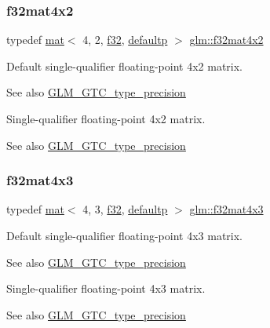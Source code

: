 \subsubsection{\texorpdfstring{f32mat4x2}{f32mat4x2}}
{\footnotesize\ttfamily typedef \hyperlink{structglm_1_1mat}{mat}$<$ 4, 2, \hyperlink{group__gtc__type__precision_ga0ec999b57f5330d9021256e96038df04}{f32}, \hyperlink{namespaceglm_a36ed105b07c7746804d7fdc7cc90ff25a9d21ccd8b5a009ec7eb7677befc3bf51}{defaultp} $>$ \hyperlink{group__gtc__type__precision_gab0498cc84bb77002f41630e3cd0be87b}{glm\+::f32mat4x2}}

Default single-\/qualifier floating-\/point 4x2 matrix. \begin{DoxySeeAlso}{See also}
\hyperlink{group__gtc__type__precision}{G\+L\+M\+\_\+\+G\+T\+C\+\_\+type\+\_\+precision}
\end{DoxySeeAlso}
Single-\/qualifier floating-\/point 4x2 matrix. \begin{DoxySeeAlso}{See also}
\hyperlink{group__gtc__type__precision}{G\+L\+M\+\_\+\+G\+T\+C\+\_\+type\+\_\+precision} 
\end{DoxySeeAlso}
\mbox{\label{group__gtc__type__precision_ga74544c9bd76adba0e7767b6b2a574d0f}} 
\subsubsection{\texorpdfstring{f32mat4x3}{f32mat4x3}}
{\footnotesize\ttfamily typedef \hyperlink{structglm_1_1mat}{mat}$<$ 4, 3, \hyperlink{group__gtc__type__precision_ga0ec999b57f5330d9021256e96038df04}{f32}, \hyperlink{namespaceglm_a36ed105b07c7746804d7fdc7cc90ff25a9d21ccd8b5a009ec7eb7677befc3bf51}{defaultp} $>$ \hyperlink{group__gtc__type__precision_ga74544c9bd76adba0e7767b6b2a574d0f}{glm\+::f32mat4x3}}

Default single-\/qualifier floating-\/point 4x3 matrix. \begin{DoxySeeAlso}{See also}
\hyperlink{group__gtc__type__precision}{G\+L\+M\+\_\+\+G\+T\+C\+\_\+type\+\_\+precision}
\end{DoxySeeAlso}
Single-\/qualifier floating-\/point 4x3 matrix. \begin{DoxySeeAlso}{See also}
\hyperlink{group__gtc__type__precision}{G\+L\+M\+\_\+\+G\+T\+C\+\_\+type\+\_\+precision} 
\end{DoxySeeAlso}
\mbox{\label{group__gtc__type__precision_ga2ba95a5c37eef05b26ac10e03daa5c84}} 
